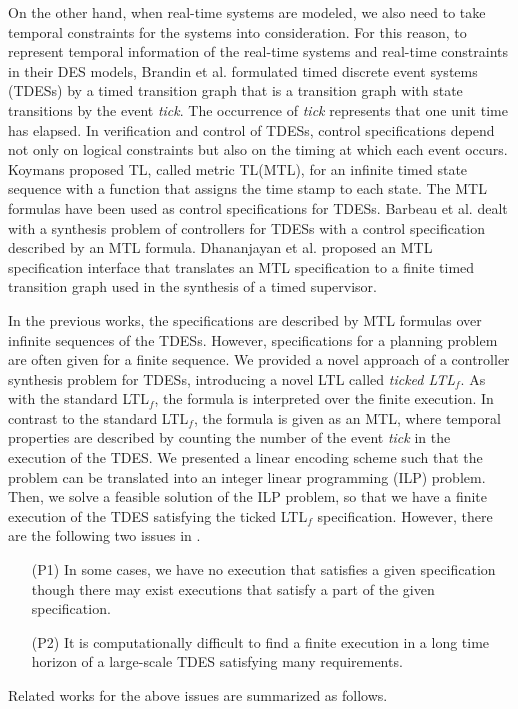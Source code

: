 \documentclass{article}
\begin{document}
On the other hand, when real-time systems are modeled, we also need to take temporal constraints for the systems into consideration.
For this reason, to represent temporal information of the real-time systems and real-time constraints in their DES models, Brandin et al.\cite{BW1994} formulated timed discrete event systems (TDESs) by a timed transition graph that is a transition graph with state transitions by the event \textit{tick}.
The occurrence of \textit{tick} represents that one unit time has elapsed.
In verification and control of TDESs, control specifications depend not only on logical constraints but also on the timing at which each event occurs. 
Koymans\cite{K1990} proposed TL, called metric TL(MTL),  for an infinite timed state sequence with a function that assigns the time stamp to each state.
The MTL formulas have been used as control specifications for TDESs.
Barbeau et al.\cite{BKD1998} dealt with a synthesis problem of controllers for TDESs with a control specification described by an MTL formula. 
Dhananjayan et al.\cite{DS2014} proposed an MTL specification interface that translates an MTL specification to a finite timed transition graph used in the synthesis of a timed supervisor.

%
In the previous works, the specifications are described by MTL formulas over infinite sequences of the TDESs. 
However, specifications for a planning problem are often given for a finite sequence\cite{camacho2019strong}. 
%
We provided a novel approach of a controller synthesis problem for TDESs, introducing a novel LTL called \textit{ticked LTL}$_f$\cite{KHU2020}.
As with the standard LTL$_f$\cite{Zhu2017}, the formula is interpreted over the finite execution.
In contrast to the standard LTL$_f$, the formula is given as an MTL, where temporal properties are described by counting the number of the event \textit{tick} in the execution of the TDES.
We presented a linear encoding scheme such that the problem can be translated into an integer linear programming (ILP) problem. 
Then, we solve a feasible solution of the ILP problem, so that we have a finite execution of the TDES satisfying the ticked LTL$_f$ specification.
However, there are the following two issues in \cite{KHU2020}.
\begin{itemize}
\setlength{\itemindent}{0.5cm}
\item[(P1)]
In some cases, we have no execution that satisfies a given specification though there may exist executions that satisfy a part of the given specification.
%
\item[(P2)]
It is computationally difficult to find a finite execution in a long time horizon of a large-scale TDES satisfying many requirements. 
\end{itemize}
%
%
Related works for the above issues are summarized as follows.
\end{document}
